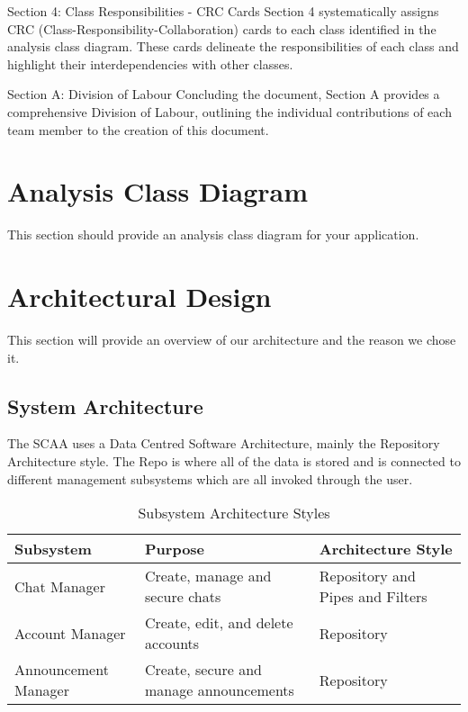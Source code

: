 \documentclass[]{article}
\begin{document}
Section 4: Class Responsibilities - CRC Cards
Section 4 systematically assigns CRC (Class-Responsibility-Collaboration) cards to each class identified in the analysis class diagram. These cards delineate the responsibilities of each class and highlight their interdependencies with other classes.

Section A: Division of Labour
Concluding the document, Section A provides a comprehensive Division of Labour, outlining the individual contributions of each team member to the creation of this document.


\section{Analysis Class Diagram}
\label{sec:analysis_class_diagram}
This section should provide an analysis class diagram for your application.


\section{Architectural Design}
\label{sec:architectural_design}
This section will provide an overview of our architecture and the reason we chose it.
\subsection{System Architecture}
\label{sub:system_architecture}
The SCAA uses a Data Centred Software Architecture, mainly the Repository Architecture style. The Repo is where all of the data is stored and is connected to different management subsystems which are all invoked through the user. 

\begin{table}[h]
	\centering
	\begin{tabular}{|>{\centering\arraybackslash}m{4cm}|>{\centering\arraybackslash}m{7cm}|>{\centering\arraybackslash}m{4cm}|}
	\hline
	\textbf{Subsystem} & \textbf{Purpose} & \textbf{Architecture Style} \\ \hline
	Chat Manager & Create, manage and secure chats & Repository and Pipes and Filters \\ \hline
	Account Manager & Create, edit, and delete accounts & Repository \\ \hline
	Announcement Manager & Create, secure and manage announcements & Repository \\ \hline
	\end{tabular}
	\caption{Subsystem Architecture Styles}
	\label{table:subsystem}
\end{table}
\end{document}
